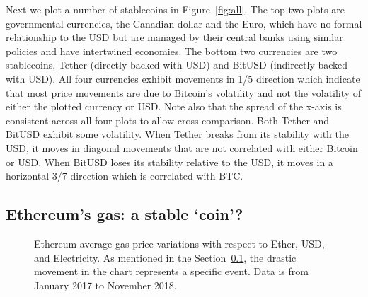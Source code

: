 Next we plot a number of stablecoins in Figure~\ref{fig:all}. The top two plots are governmental currencies, the Canadian dollar and the Euro, which have no formal relationship to the USD but are managed by their central banks using similar policies and have intertwined economies. The bottom two currencies are two stablecoins, Tether (directly backed with USD) and BitUSD (indirectly backed with USD). All four currencies exhibit movements in 1/5 direction which indicate that most price movements are due to Bitcoin's volatility and not the volatility of either the plotted currency or USD. Note also that the spread of the x-axis is consistent across all four plots to allow cross-comparison. Both Tether and BitUSD exhibit some volatility. When Tether breaks from its stability with the USD, it moves in diagonal movements that are not correlated with either Bitcoin or USD. When BitUSD loses its stability relative to the USD, it moves in a horizontal 3/7 direction which is correlated with BTC.


\subsection {Ethereum's gas: a stable `coin'?}\label{sec:GasInvs}

\begin{figure}[t]
	\centering
	\hfill
	\caption {Ethereum average gas price variations with respect to Ether, USD, and Electricity. As mentioned in the Section~\ref{sec:GasInvs}, the drastic movement in the chart represents a specific event. Data is from January 2017 to November 2018.}
	\label{fig:gas}
\end{figure}

